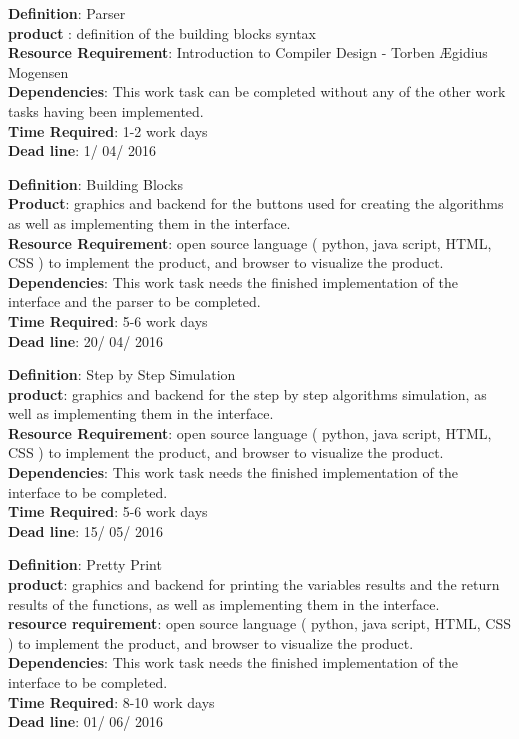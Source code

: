 \documentclass[11pt]{article}
\begin{document}
\noindent\textbf{Definition}:  Parser \\
\textbf{product} : definition of the building blocks syntax\\
\textbf{Resource Requirement}: Introduction to Compiler Design - Torben Ægidius Mogensen\\
\textbf{Dependencies}: This work task can be completed without any of the other work tasks having been implemented.\\
\textbf{Time Required}: 1-2 work days\\
\textbf{Dead line}: 1/ 04/ 2016\\
\noindent\makebox[\linewidth]{\rule{\paperwidth}{0.4pt}}

\noindent\textbf{Definition}: Building Blocks \\
\textbf{Product}: graphics and backend for the buttons used for creating the algorithms as well as implementing them in the interface.\\
\textbf{Resource Requirement}: open source language ( python, java script, HTML, CSS ) to implement the product, and browser to visualize the product. \\
\textbf{Dependencies}: This work task needs the finished implementation of the interface and the parser to be completed.\\
\textbf{Time Required}: 5-6 work days\\
\textbf{Dead line}: 20/ 04/ 2016\\
\noindent\makebox[\linewidth]{\rule{\paperwidth}{0.4pt}}

\noindent\textbf{Definition}:  Step by Step Simulation\\
\textbf{product}: graphics and backend for the step by step  algorithms simulation, as well as implementing them in the interface.\\
\textbf{Resource Requirement}: open source language ( python, java script, HTML, CSS ) to implement the product, and browser to visualize the product. \\
\textbf{Dependencies}: This work task needs the finished implementation of the interface to be completed.\\
\textbf{Time Required}: 5-6 work days\\
\textbf{Dead line}: 15/ 05/ 2016\\
\noindent\makebox[\linewidth]{\rule{\paperwidth}{0.4pt}}

\noindent\textbf{Definition}:  Pretty Print\\
\textbf{product}: graphics and backend for printing the variables results and the return results of the functions, as well as implementing them in the interface.\\
\textbf{resource requirement}: open source language ( python, java script, HTML, CSS ) to implement the product, and browser to visualize the product. \\
\textbf{Dependencies}: This work task needs the finished implementation of the interface to be completed.\\
\textbf{Time Required}: 8-10 work days\\
\textbf{Dead line}: 01/ 06/ 2016\\
\end{document}
